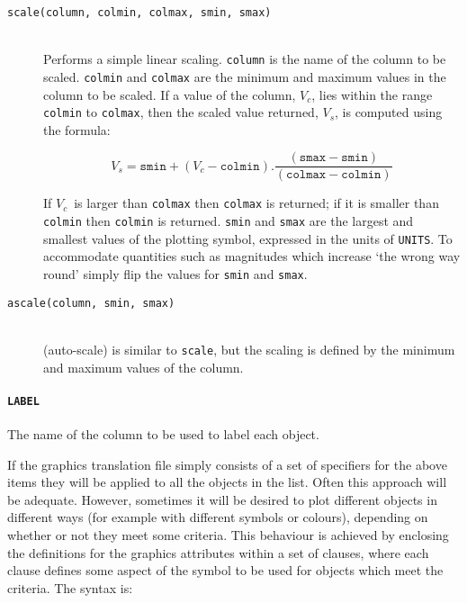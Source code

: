 \documentclass[twoside,11pt]{starlink}
\begin{document}
\begin{description}

  \item[\texttt{scale(column, colmin, colmax, smin, smax)}] ~
  \\ Performs a simple linear scaling.  \texttt{column} is the name of
   the column to be scaled.  \texttt{colmin} and \texttt{colmax} are the
   minimum and maximum values in the column to be scaled.  If a
   value of the column, $V_{c}$, lies within the range \texttt{colmin}
   to \texttt{colmax}, then the scaled value returned, $V_{s}$, is
   computed using the formula:

  \begin{equation}
   V_{s} = \texttt{smin} + (V_{c} - \texttt{colmin}) .
   \frac{(\texttt{smax} - \texttt{smin} ) }{(\texttt{colmax} - \texttt{colmin} ) }
  \end{equation}

   If $V_{c}$\, is larger than \texttt{colmax} then \texttt{colmax} is
   returned; if it is smaller than \texttt{colmin} then \texttt{colmin} is
   returned.  \texttt{smin} and \texttt{smax} are the largest and smallest
   values of the plotting symbol, expressed in the units of \texttt{UNITS}.
   To accommodate quantities such as magnitudes which increase `the
   wrong way round' simply flip the values for \texttt{smin} and \texttt{smax}.

  \item[\texttt{ascale(column, smin, smax)}] ~
  \\ (auto-scale) is similar to \texttt{scale}, but the scaling is defined by
   the minimum and maximum values of the column.

\end{description}

\paragraph{\texttt{LABEL}} The name of the column to be used to label each object.

\vspace{5mm}

If the graphics translation file simply consists of a set of specifiers
for the above items they will be applied to all the objects in the list.
Often this approach will be adequate.  However, sometimes it will be
desired to plot different objects in different ways (for example with
different symbols or colours), depending on whether or not they meet
some criteria.  This behaviour is achieved by enclosing the definitions
for the graphics attributes within a set of clauses, where each clause
defines some aspect of the symbol to be used for objects which meet the
criteria.  The syntax is:
\end{document}
